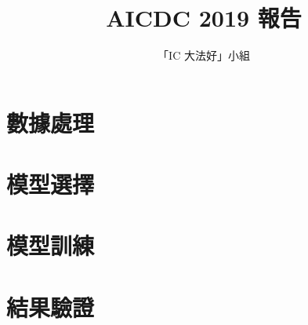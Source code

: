 \documentclass[11pt, oneside]{article}   	%
\title{AICDC 2019 報告}
\author{「IC 大法好」小組}
\begin{document}
\maketitle
\newpage
\tableofcontents
\newpage
\section{數據處理}

\section{模型選擇}

\section{模型訓練}

\section{結果驗證}
\end{document}
